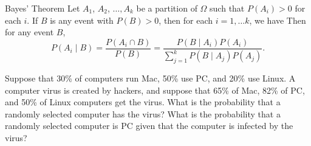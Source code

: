 

\clearpage

\bbox
\begin{theorem}{Bayes' Theorem}\label{thm:bayes}
Let $A_1$, $A_2$, $\ldots , A_k$ be a partition of $\Omega$ such that $P(A_i)>0$ for each $i$. If $B$ is any event with $P(B)>0$, then for each $i=1, \ldots k$, we have
Then for any event $B$,
\[ P(A_i \mid B) = \frac{P(A_i \cap B) }{P(B)} = \frac{P(B \mid A_i) P(A_i)}{\sum_{j=1}^k P(B \mid A_j)P(A_j)}.\]
\end{theorem}
\ebox

\bb[resume]
\ii Suppose that 30\% of computers run Mac, 50\% use PC, and 20\% use Linux. A computer virus is
created by hackers, and suppose that  65\% of Mac, 82\% of PC, and 50\% of Linux computers get the virus.
\bb
\ii What is the probability that a randomly selected computer has the virus? \vfill
\ii What is the probability that a randomly selected computer is PC given that the computer is infected by the virus?\vfill \vspace{1in}
\ee
\ee

